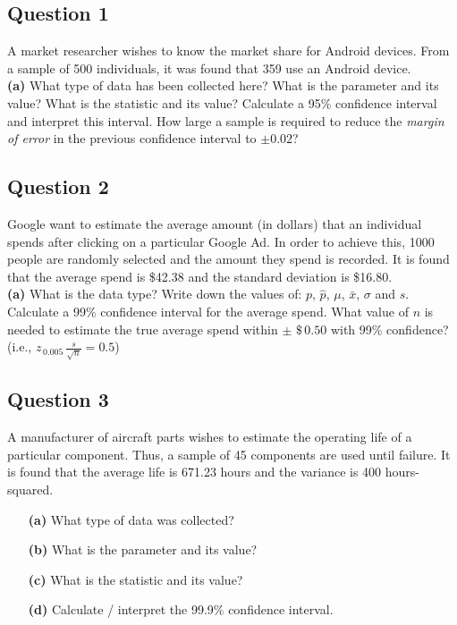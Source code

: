 \documentclass[12pt]{article}
\begin{document}
\subsection*{Question 1}
A market researcher wishes to know the market share for Android devices. From a sample of 500 individuals, it was found that 359 use an Android device.\\[-0.2cm]

{\bf(a)} What type of data has been collected here?  What is the parameter and its value?  What is the statistic and its value?  Calculate a 95\% confidence interval and interpret this interval.  How large a sample is required to reduce the \emph{margin of error} in the previous confidence interval to $\pm 0.02$?



\subsection*{Question 2}
Google want to estimate the average amount (in dollars) that an individual spends after clicking on a particular Google Ad. In order to achieve this, 1000 people are randomly selected and the amount they spend is recorded. It is found that the average spend is \$42.38 and the standard deviation is \$16.80.\\[-0.2cm]


{\bf(a)} What is the data type?  Write down the values of: $p$, $\hat p$, $\mu$, $\bar x$, $\sigma$ and $s$.  Calculate a 99\% confidence interval for the average spend.  What value of $n$ is needed to estimate the true average spend within $\pm \,\, \$\,0.50$ with 99\% confidence? (i.e., $z_{\,0.005}\,\frac{s}{\sqrt{n}} = 0.5$)





\subsection*{Question 3}
A manufacturer of aircraft parts wishes to estimate the operating life of a particular component. Thus, a sample of 45 components are used until failure. It is found that the average life is 671.23 hours and the variance is 400 hours-squared.
\begin{itemize}
\item[{\bf(a)}] What type of data was collected? \quad \item[{\bf(b)}] What is the parameter and its value? \quad \item[{\bf(c)}] What is the statistic and its value? \quad \item[{\bf(d)}] Calculate / interpret the 99.9\% confidence interval.
\end{itemize}
\end{document}
